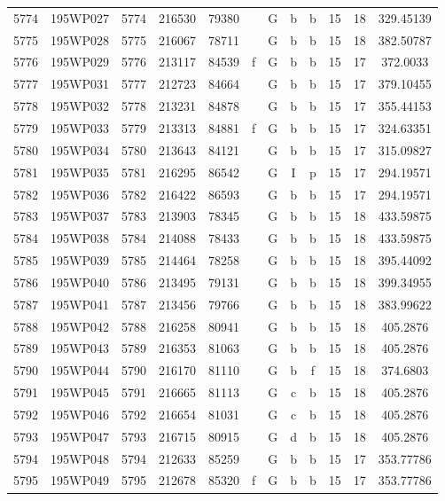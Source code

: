 \begin{tabular}{|*{12}{c|}}
5774 & 195WP027 & 5774 & 216530 & 79380 &  & G & b & b & 15 & 18 & 329.45139 \\ 
5775 & 195WP028 & 5775 & 216067 & 78711 &  & G & b & b & 15 & 18 & 382.50787 \\ 
5776 & 195WP029 & 5776 & 213117 & 84539 & f & G & b & b & 15 & 17 & 372.0033 \\ 
5777 & 195WP031 & 5777 & 212723 & 84664 &  & G & b & b & 15 & 17 & 379.10455 \\ 
5778 & 195WP032 & 5778 & 213231 & 84878 &  & G & b & b & 15 & 17 & 355.44153 \\ 
5779 & 195WP033 & 5779 & 213313 & 84881 & f & G & b & b & 15 & 17 & 324.63351 \\ 
5780 & 195WP034 & 5780 & 213643 & 84121 &  & G & b & b & 15 & 17 & 315.09827 \\ 
5781 & 195WP035 & 5781 & 216295 & 86542 &  & G & I & p & 15 & 17 & 294.19571 \\ 
5782 & 195WP036 & 5782 & 216422 & 86593 &  & G & b & b & 15 & 17 & 294.19571 \\ 
5783 & 195WP037 & 5783 & 213903 & 78345 &  & G & b & b & 15 & 18 & 433.59875 \\ 
5784 & 195WP038 & 5784 & 214088 & 78433 &  & G & b & b & 15 & 18 & 433.59875 \\ 
5785 & 195WP039 & 5785 & 214464 & 78258 &  & G & b & b & 15 & 18 & 395.44092 \\ 
5786 & 195WP040 & 5786 & 213495 & 79131 &  & G & b & b & 15 & 18 & 399.34955 \\ 
5787 & 195WP041 & 5787 & 213456 & 79766 &  & G & b & b & 15 & 18 & 383.99622 \\ 
5788 & 195WP042 & 5788 & 216258 & 80941 &  & G & b & b & 15 & 18 & 405.2876 \\ 
5789 & 195WP043 & 5789 & 216353 & 81063 &  & G & b & b & 15 & 18 & 405.2876 \\ 
5790 & 195WP044 & 5790 & 216170 & 81110 &  & G & b & f & 15 & 18 & 374.6803 \\ 
5791 & 195WP045 & 5791 & 216665 & 81113 &  & G & c & b & 15 & 18 & 405.2876 \\ 
5792 & 195WP046 & 5792 & 216654 & 81031 &  & G & c & b & 15 & 18 & 405.2876 \\ 
5793 & 195WP047 & 5793 & 216715 & 80915 &  & G & d & b & 15 & 18 & 405.2876 \\ 
5794 & 195WP048 & 5794 & 212633 & 85259 &  & G & b & b & 15 & 17 & 353.77786 \\ 
5795 & 195WP049 & 5795 & 212678 & 85320 & f & G & b & b & 15 & 17 & 353.77786 \\ 

\end{tabular}
